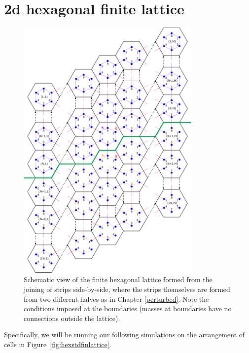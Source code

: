 \section{2d hexagonal finite lattice}
\begin{figure}[!h]
\centering
\includegraphics[width=0.8\textwidth]{imgs/hexfinitemodel.png}
\caption{\label{fig:hexfinscheme} Schematic view of the finite hexagonal
  lattice formed from the joining of strips side-by-side, where the strips
  themselves are formed from two different halves as in Chapter
  \ref{perturbed}.  Note the conditions imposed at the boundaries (masses at
  boundaries have no connections outside the lattice).}
\end{figure}

Specifically, we will be running our following simulations on the arrangement
of cells in Figure~\ref{fig:hexstdfinlattice}.

